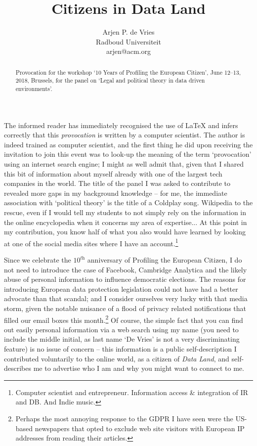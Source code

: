 \documentclass[a4paper,twoside,12pt]{article}
\title{Citizens in Data Land}
\author{Arjen P. de Vries\\Radboud Universiteit\\arjen@acm.org}
\date{}
\begin{document}
\maketitle

\begin{abstract}
Provocation for the workshop `10 Years of Profiling the European Citizen', June 12--13, 2018, Brussels, for the panel on `Legal and political theory in data driven environments'.
\end{abstract}

The informed reader has immediately recognised the use of \LaTeX{} and infers correctly that this \emph{provocation} is written by a computer scientist. The author is indeed trained as computer scientist, and the first thing he did upon receiving the invitation to join this event was to look-up the meaning of the term `provocation' using an internet search engine; I might as well admit that, given that I shared this bit of information about myself already with one of the largest tech companies in the world. The title of the panel I was asked to contribute to revealed more gaps in my background knowledge -- for me, the immediate association with `political theory' is the title of a Coldplay song. Wikipedia to the rescue, even if I would tell my students to not simply rely on the information in the online encyclopedia when it concerns my area of expertise... At this point in my contribution, you know half of what you also would have learned by looking at one of the social media sites where I have an account.\footnote{%
Computer scientist and entrepreneur. Information access \& integration of IR and DB. And Indie music.}

Since we celebrate the $10^\textit{th}$ anniversary of Profiling the European Citizen, I do not need to introduce the case of Facebook, Cambridge Analytica and the likely abuse of personal information to influence democratic elections. The reasons for introducing European data protection legislation could not have had a better advocate than that scandal; and I consider ourselves very lucky with that media storm, given the notable nuisance of a flood of privacy related notifications that filled our email boxes this month.\footnote{%
Perhaps the most annoying response to the GDPR I have seen were the US-based newspapers that opted to exclude web site visitors with European IP addresses from reading their articles.}
Of course, the simple fact that you can find out easily personal information via a web search using my name (you need to include the middle initial, as last name `De Vries' is not a very discriminating feature) is no issue of concern -- this information is a public self-description I contributed voluntarily to the online world, as a citizen of \emph{Data Land}, and self-describes me to advertise who I am and why you might want to connect to me.
\end{document}
